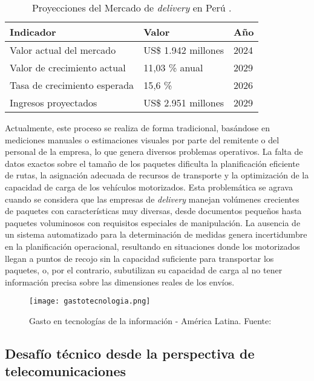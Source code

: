 \begin{table}[H]
\centering
\caption{Proyecciones del Mercado de \textit{delivery} en Perú \cite{WebRef13249}.}
\label{tab:proyecciones_delivery}
\begin{tabular}{@{}p{5.5cm}p{3.5cm}p{2cm}@{}}
\toprule
\textbf{Indicador} & \textbf{Valor} & \textbf{Año} \\
\midrule
Valor actual del mercado & US\$ 1.942 millones & 2024 \\
\addlinespace
Valor de crecimiento actual & 11,03 \% anual & 2029 \\
\addlinespace
Tasa de crecimiento esperada & 15,6 \% & 2026 \\
\addlinespace
Ingresos proyectados & US\$ 2.951 millones & 2029 \\
\bottomrule
\end{tabular}
\end{table}

Actualmente, este proceso se realiza de forma tradicional, basándose en mediciones manuales o estimaciones visuales por parte del remitente o del personal de la empresa, lo que genera diversos problemas operativos. La falta de datos exactos sobre el tamaño de los paquetes dificulta la planificación eficiente de rutas, la asignación adecuada de recursos de transporte y la optimización de la capacidad de carga de los vehículos motorizados.
Esta problemática se agrava cuando se considera que las empresas de \textit{delivery} manejan volúmenes crecientes de paquetes con características muy diversas, desde documentos pequeños hasta paquetes voluminosos con requisitos especiales de manipulación. La ausencia de un sistema automatizado para la determinación de medidas genera incertidumbre en la planificación operacional, resultando en situaciones donde los motorizados llegan a puntos de recojo sin la capacidad suficiente para transportar los paquetes, o, por el contrario, subutilizan su capacidad de carga al no tener información precisa sobre las dimensiones reales de los envíos.
\begin{figure}[H]
    \centering
    \texttt{[image: gastotecnologia.png]}
    \caption{Gasto en tecnologías de la información - América Latina. Fuente: \cite{ArticleRef255142}}
    \label{fig:gastos}
\end{figure}

\subsection{Desafío técnico desde la perspectiva de telecomunicaciones}

